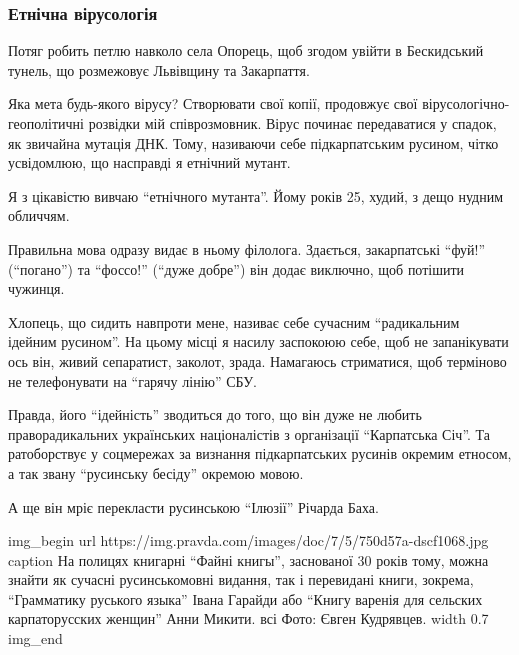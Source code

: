  
 
 

\subsubsection{Етнічна вірусологія}
\label{sec:11_11_2020.news.ua.pravda.1.rusynstvo.etnichna_virusologia}

Потяг робить петлю навколо села Опорець, щоб згодом увійти в Бескидський
тунель, що розмежовує Львівщину та Закарпаття.

\dshM Яка мета будь-якого вірусу? Створювати свої копії, \dshM продовжує свої
вірусологічно-геополітичні розвідки мій співрозмовник. \dshM Вірус починає
передаватися у спадок, як звичайна мутація ДНК. Тому, називаючи себе
підкарпатським русином, чітко усвідомлюю, що насправді я етнічний мутант.

Я з цікавістю вивчаю \enquote{етнічного мутанта}. Йому років 25, худий, з дещо нудним
обличчям.

Правильна мова одразу видає в ньому філолога. Здається, закарпатські \enquote{фуй!}
(\enquote{погано}) та \enquote{фоссо!} (\enquote{дуже добре}) він додає виключно, щоб потішити чужинця.

Хлопець, що сидить навпроти мене, називає себе сучасним \enquote{радикальним ідейним
русином}. На цьому місці я насилу заспокоюю себе, щоб не запанікувати \dshM ось
він, живий сепаратист, заколот, зрада. Намагаюсь стриматися, щоб терміново не
телефонувати на \enquote{гарячу лінію} СБУ. 

Правда, його \enquote{ідейність} зводиться до того, що він дуже не любить
праворадикальних українських націоналістів з організації \enquote{Карпатська Січ}. Та
ратоборствує у соцмережах за визнання підкарпатських русинів окремим етносом, а
так звану \enquote{русинську бесіду} \dshM окремою мовою.

А ще він мріє перекласти русинською \enquote{Ілюзії} Річарда Баха.

\ifcmt
img_begin 
    url https://img.pravda.com/images/doc/7/5/750d57a-dscf1068.jpg
    caption На полицях книгарні \enquote{Файні книгы}, заснованої 30 років тому, можна знайти як сучасні русинськомовні видання, так і перевидані книги, зокрема, \enquote{Грамматику руського языка} Івана Гарайди або \enquote{Книгу варенія для сельских карпаторусских женщин} Анни Микити. всі Фото: Євген Кудрявцев.
    width 0.7
img_end
\fi

